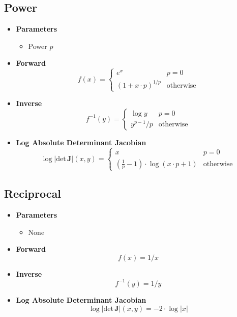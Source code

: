 \documentclass{article}
\begin{document}
\subsection{Power}
\begin{itemize}
  \item \textbf{Parameters}
  \begin{itemize}
    \item Power $p$
  \end{itemize}
  \item \textbf{Forward}
  \begin{equation}
    f(x) = \begin{cases} e^x & p = 0 \\ \left( 1 + x \cdot p \right) ^ {1 / p} & \text{otherwise} \end{cases}
  \end{equation}
  \item \textbf{Inverse}
  \begin{equation}
    f^{-1}(y) = \begin{cases} \log y & p = 0 \\ y^{p - 1} / p & \text{otherwise} \end{cases}
  \end{equation}
  \item \textbf{Log Absolute Determinant Jacobian}
  \begin{equation}
    \log \vert \text{det} \, \mathbf{J} \vert (x, y) = \begin{cases} x & p = 0 \\ \left(\frac{1}{p} - 1 \right) \cdot \log \left(x \cdot p + 1 \right) & \text{otherwise} \end{cases}
  \end{equation}
\end{itemize}
\subsection{Reciprocal}
\begin{itemize}
  \item \textbf{Parameters}
  \begin{itemize}
    \item None
  \end{itemize}
  \item \textbf{Forward}
  \begin{equation}
    f(x) = 1 / x
  \end{equation}
  \item \textbf{Inverse}
  \begin{equation}
    f^{-1}(y) = 1 / y
  \end{equation}
  \item \textbf{Log Absolute Determinant Jacobian}
  \begin{equation}
    \log \vert \text{det} \, \mathbf{J} \vert (x, y) = -2 \cdot \log \vert x \vert
  \end{equation}
\end{itemize}
\end{document}
